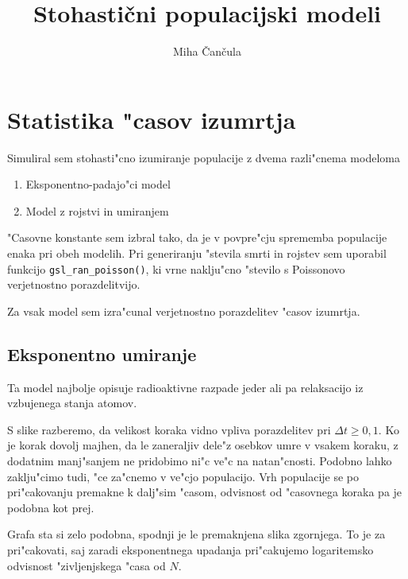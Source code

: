 \documentclass[a4paper,10pt]{article}
\title{Stohasti\v cni populacijski modeli}
\author{Miha \v Can\v cula}
\begin{document}
\maketitle

\newcommand{\poisson}[2]{
  \frac{#2^{#1}}{#1!} e^{-#2}  
}

\newcommand{\poi}[1]{\poisson{#1}{\overline{#1}}}

\section{Statistika "casov izumrtja}

Simuliral sem stohasti"cno izumiranje populacije z dvema razli"cnema modeloma
\begin{enumerate}
 \item Eksponentno-padajo"ci model
 \item Model z rojstvi in umiranjem
\end{enumerate}

"Casovne konstante sem izbral tako, da je v povpre"cju sprememba populacije enaka pri obeh modelih. Pri generiranju "stevila smrti in rojstev sem uporabil funkcijo \texttt{gsl\_ran\_poisson()}, ki vrne naklju"cno "stevilo s Poissonovo verjetnostno porazdelitvijo. 

Za vsak model sem izra"cunal verjetnostno porazdelitev "casov izumrtja. 

\subsection{Eksponentno umiranje}

Ta model najbolje opisuje radioaktivne razpade jeder ali pa relaksacijo iz vzbujenega stanja atomov. 



S slike razberemo, da velikost koraka vidno vpliva porazdelitev pri $\Delta t \geq 0,1$. Ko je korak dovolj majhen, da le zaneraljiv dele"z osebkov umre v vsakem koraku, z dodatnim manj"sanjem ne pridobimo ni"c ve"c na natan"cnosti. Podobno lahko zaklju"cimo tudi, "ce za"cnemo v ve"cjo populacijo.  Vrh populacije se po pri"cakovanju premakne k dalj"sim "casom, odvisnost od "casovnega koraka pa je podobna kot prej. 



Grafa sta si zelo podobna, spodnji je le premaknjena slika zgornjega. To je za pri"cakovati, saj zaradi eksponentnega upadanja pri"cakujemo logaritemsko odvisnost "zivljenjskega "casa od $N$. 
\end{document}
